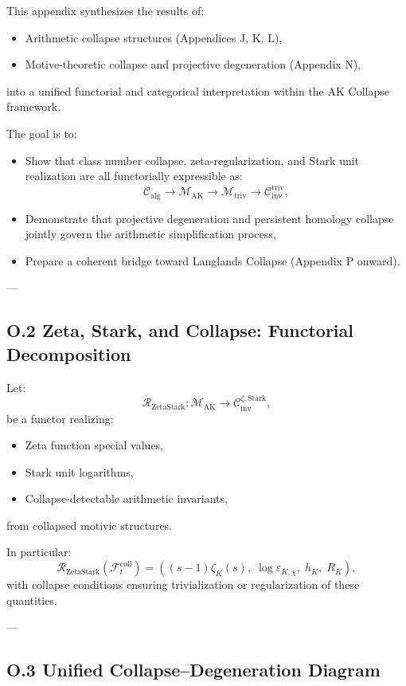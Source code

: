 \documentclass[11pt]{article}
\begin{document}
This appendix synthesizes the results of:
\begin{itemize}
  \item Arithmetic collapse structures (Appendices J, K, L),
  \item Motive-theoretic collapse and projective degeneration (Appendix N),
\end{itemize}
into a unified functorial and categorical interpretation within the AK Collapse framework.

The goal is to:
\begin{itemize}
  \item Show that class number collapse, zeta-regularization, and Stark unit realization are all functorially expressible as:
  \[
  \mathcal{C}_{\mathrm{alg}} \longrightarrow \mathcal{M}_{\mathrm{AK}} \longrightarrow \mathcal{M}_{\mathrm{triv}} \longrightarrow \mathcal{C}_{\mathrm{inv}}^{\mathrm{triv}},
  \]
  \item Demonstrate that projective degeneration and persistent homology collapse jointly govern the arithmetic simplification process,
  \item Prepare a coherent bridge toward Langlands Collapse (Appendix P onward).
\end{itemize}

---

\subsection*{O.2 Zeta, Stark, and Collapse: Functorial Decomposition}

Let:
\[
\mathcal{R}_{\mathrm{ZetaStark}} : \mathcal{M}_{\mathrm{AK}} \longrightarrow \mathcal{C}_{\mathrm{inv}}^{\zeta, \mathrm{Stark}},
\]
be a functor realizing:
\begin{itemize}
  \item Zeta function special values,
  \item Stark unit logarithms,
  \item Collapse-detectable arithmetic invariants,
\end{itemize}
from collapsed motivic structures.

In particular:
\[
\mathcal{R}_{\mathrm{ZetaStark}}(\mathcal{F}_t^{\mathrm{coll}}) =
\left( (s - 1)\zeta_K(s),\; \log \varepsilon_{K,\chi},\; h_K,\; R_K \right),
\]
with collapse conditions ensuring trivialization or regularization of these quantities.

---

\subsection*{O.3 Unified Collapse–Degeneration Diagram}
\end{document}

